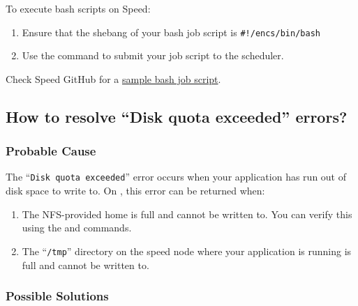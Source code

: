 To execute bash scripts on Speed:
\begin{enumerate}
	\item Ensure that the shebang of your bash job script is \verb+#!/encs/bin/bash+
	\item Use the  command to submit your job script to the scheduler.
\end{enumerate}

\noindent Check Speed GitHub for a 
\href{https://github.com/NAG-DevOps/speed-hpc/blob/master/src/bash.sh}{sample bash job script}.

\subsection{How to resolve ``Disk quota exceeded'' errors?}

\subsubsection{Probable Cause}

The ``\texttt{Disk quota exceeded}'' error occurs when your application has 
run out of disk space to write to. On , this error can be returned when:
\begin{enumerate}
	\item The NFS-provided home is full and cannot be written to.
	You can verify this using the  and  commands.
	\item The ``\texttt{/tmp}'' directory on the speed node where your application is running is full and cannot be written to.
\end{enumerate}

\subsubsection{Possible Solutions}

